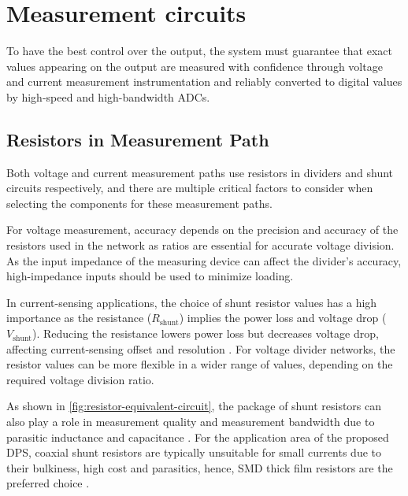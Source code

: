 

\section{Measurement circuits}
\label{sec:meas-instr}
To have the best control over the output, the system must
guarantee that exact values appearing on the output are measured with confidence
through voltage and current measurement instrumentation and reliably converted
to digital values by high-speed and high-bandwidth \acs{ADC}s.


\subsection{Resistors in Measurement Path}
\label{subsec:shunt-resistor-considerations}

Both voltage and current measurement paths use resistors in dividers
and shunt circuits respectively, and there are multiple critical
factors to consider when selecting the components for these measurement paths.

For voltage measurement, accuracy depends on the precision and
accuracy of the resistors used in the network as ratios are essential
for accurate voltage division.
As the input impedance of the measuring device can affect the divider's
accuracy, high-impedance inputs should be used to minimize loading.

In current-sensing applications, the choice of shunt resistor values has a high
importance as the resistance (\(R_{\text{shunt}}\)) implies the power loss and
voltage drop (\(V_{\text{shunt}}\)).
Reducing the resistance lowers power loss but decreases
voltage drop, affecting current-sensing offset and resolution
\autocite{7384698}.
For voltage divider networks, the resistor values can be more flexible
in a wider range of values, depending on the required voltage division ratio.

As shown in \autoref{fig:resistor-equivalent-circuit}, the package of shunt
resistors can also play a role in measurement quality and measurement bandwidth
due to parasitic inductance and capacitance \autocite{shunt-resistor}.
For the application area of the proposed \acs{DPS}, coaxial shunt resistors are
typically unsuitable for small currents due to their bulkiness, high cost and
parasitics, hence, \acs{SMD} thick film resistors are the preferred
choice \autocite{Costa}.

